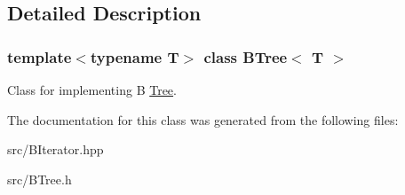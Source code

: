 \subsection{Detailed Description}
\subsubsection*{template$<$typename T$>$\newline
class B\+Tree$<$ T $>$}

Class for implementing B \hyperlink{classTree}{Tree}. 

The documentation for this class was generated from the following files\+:\begin{DoxyCompactItemize}
\item 
src/B\+Iterator.\+hpp\item 
src/B\+Tree.\+h\end{DoxyCompactItemize}

